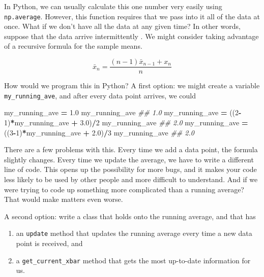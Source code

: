 \documentclass[
  12pt,
  krantz2]{krantz}
\makeatletter
\newenvironment{Shaded}{\begin{snugshade}}{\end{snugshade}}
\newcommand{\CommentTok}[1]{\textcolor[rgb]{0.37,0.37,0.37}{\textit{#1}}}
\newcommand{\DecValTok}[1]{\textcolor[rgb]{0.06,0.06,0.06}{#1}}
\newcommand{\FloatTok}[1]{\textcolor[rgb]{0.06,0.06,0.06}{#1}}
\newcommand{\NormalTok}[1]{#1}
\newcommand{\OperatorTok}[1]{\textcolor[rgb]{0.43,0.43,0.43}{\textbf{#1}}}
\providecommand{\tightlist}{%
  \setlength{\itemsep}{0pt}\setlength{\parskip}{0pt}}
\newenvironment{kframe}{%
\medskip{}
\setlength{\fboxsep}{.8em}
 \def\at@end@of@kframe{}%
 \ifinner\ifhmode%
  \def\at@end@of@kframe{\end{minipage}}%
  \begin{minipage}{\columnwidth}%
 \fi\fi%
 \def\FrameCommand##1{\hskip\@totalleftmargin \hskip-\fboxsep
 \colorbox{shadecolor}{##1}\hskip-\fboxsep
     \hskip-\linewidth \hskip-\@totalleftmargin \hskip\columnwidth}%
 \MakeFramed {\advance\hsize-\width
   \@totalleftmargin\z@ \linewidth\hsize
   \@setminipage}}%
 {\par\unskip\endMakeFramed%
 \at@end@of@kframe}
\renewenvironment{Shaded}{\begin{kframe}}{\end{kframe}}
\makeatother
\begin{document}
In Python, we can usually calculate this one number very easily using \texttt{np.average}. However, this function requires that we pass into it all of the data at once. What if we don't have all the data at any given time? In other words, suppose that the data arrive intermittently
.
We might consider taking advantage of a recursive formula for the sample means.

\begin{equation} 
\bar{x}_n =  \frac{(n-1) \bar{x}_{n-1} + x_n}{n}
\end{equation}

How would we program this in Python? A first option: we might create a variable \texttt{my\_running\_ave}, and after every data point arrives, we could

\begin{Shaded}
\begin{Highlighting}[]
\NormalTok{my\_running\_ave }\OperatorTok{=} \FloatTok{1.0}
\NormalTok{my\_running\_ave}
\CommentTok{\#\# 1.0}
\NormalTok{my\_running\_ave }\OperatorTok{=}\NormalTok{ ((}\DecValTok{2}\OperatorTok{{-}}\DecValTok{1}\NormalTok{)}\OperatorTok{*}\NormalTok{my\_running\_ave }\OperatorTok{+} \FloatTok{3.0}\NormalTok{)}\OperatorTok{/}\DecValTok{2}
\NormalTok{my\_running\_ave}
\CommentTok{\#\# 2.0}
\NormalTok{my\_running\_ave }\OperatorTok{=}\NormalTok{ ((}\DecValTok{3}\OperatorTok{{-}}\DecValTok{1}\NormalTok{)}\OperatorTok{*}\NormalTok{my\_running\_ave }\OperatorTok{+} \FloatTok{2.0}\NormalTok{)}\OperatorTok{/}\DecValTok{3}
\NormalTok{my\_running\_ave}
\CommentTok{\#\# 2.0}
\end{Highlighting}
\end{Shaded}

There are a few problems with this. Every time we add a data point, the formula slightly changes. Every time we update the average, we have to write a different line of code. This opens up the possibility for more bugs, and it makes your code less likely to be used by other people and more difficult to understand. And if we were trying to code up something more complicated than a running average? That would make matters even worse.

A second option: write a class that holds onto the running average, and that has

\begin{enumerate}
\def\labelenumi{\arabic{enumi}.}
\tightlist
\item
  an \texttt{update} method that updates the running average every time a new data point is received, and
\item
  a \texttt{get\_current\_xbar} method that gets the most up-to-date information for us.
\end{enumerate}
\end{document}
